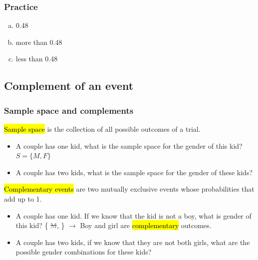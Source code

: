 \begin{frame}
\frametitle{Practice}


\begin{enumerate}[(a)]
\item 0.48
\item more than 0.48
\item less than 0.48
\end{enumerate}


\end{frame}



\subsection{Complement of an event}


\begin{frame}
\frametitle{Sample space and complements}

\hl{Sample space} is the collection of all possible outcomes of a trial.

\begin{itemize}
\item A couple has one kid, what is the sample space for the gender of this kid? $S = \{ M, F \}$
\item A couple has two kids, what is the sample space for the gender of these kids? 
\end{itemize}

\pause

\hl{Complementary events} are two mutually exclusive events whose probabilities that add up to 1.

\begin{itemize}
\item A couple has one kid. If we know that the kid is not a boy, what is gender of this kid?
\{ \sout{\textcolor{gray}{M}},  \} $\rightarrow$ Boy and girl are \hl{complementary} outcomes.
\item A couple has two kids, if we know that they are not both girls, what are the possible gender combinations for these kids?
\end{itemize}

\end{frame}

